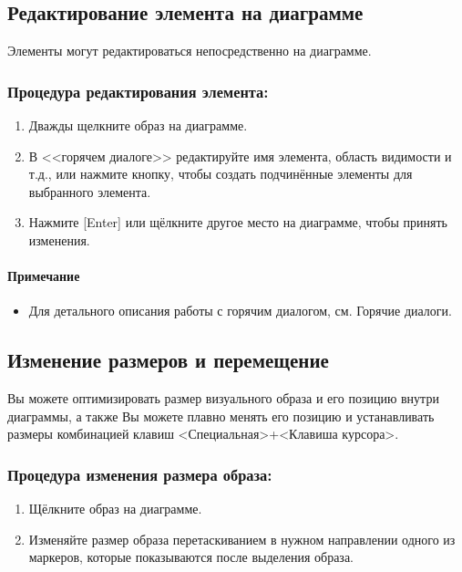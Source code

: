 \documentclass[a4paper,12pt]{extreport}
\begin{document}
\subsection*{Редактирование элемента на диаграмме}
Элементы могут редактироваться непосредственно на диаграмме.
\subsubsection*{Процедура редактирования элемента:}
\begin{enumerate}
	\item Дважды щелкните образ на диаграмме.
	\item В <<горячем диалоге>> редактируйте имя элемента, область видимости и т.д., или нажмите
	кнопку, чтобы создать подчинённые элементы для выбранного элемента.
	\item Нажмите [Enter] или щёлкните другое место на диаграмме, чтобы принять изменения.
\end{enumerate}

\paragraph{Примечание}
\begin{itemize}
	\item Для детального описания работы с горячим диалогом, см. Горячие диалоги.
	
\end{itemize}

\subsection*{Изменение размеров и перемещение}
Вы можете оптимизировать размер визуального образа и его позицию внутри диаграммы, а
также Вы можете плавно менять его позицию и устанавливать размеры комбинацией клавиш
<Специальная>+<Клавиша курсора>.

\subsubsection*{Процедура изменения размера образа:}
\begin{enumerate}
	\item  Щёлкните образ на диаграмме.
	\item Изменяйте размер образа перетаскиванием в нужном направлении одного из маркеров, которые показываются после выделения образа.
\end{enumerate}
\end{document}
